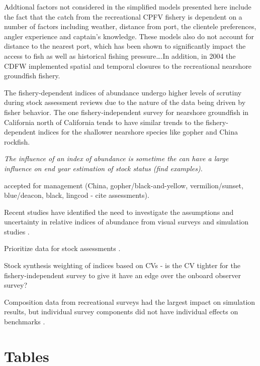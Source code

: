 \documentclass[
  12pt,
  authoryear,
  preprint,
  3p]{elsarticle}
\begin{document}
Addtional factors not considered in the simplified models presented here
include the fact that the catch from the recreational CPFV fishery is
dependent on a number of factors including weather, distance from port,
the clientele preferences, angler experience and captain's knowledge.
These models also do not account for distance to the nearest port, which
has been shown to significantly impact the access to fish as well as
historical fishing pressure\ldots.In addition, in 2004 the CDFW
implemented spatial and temporal closures to the recreational nearshore
groundfish fishery.

The fishery-dependent indices of abundance undergo higher levels of
scrutiny during stock assessment reviews due to the nature of the data
being driven by fisher behavior. The one fishery-independent survey for
nearshore groundfish in California north of California tends to have
similar trends to the fishery-dependent indices for the shallower
nearshore species like gopher and China rockfish.

\emph{The influence of an index of abundance is sometime the can have a
large influence on end year estimation of stock status (find examples).}

accepted for management (China, gopher/black-and-yellow,
vermilion/sunset, blue/deacon, black, lingcod - cite assessments).

Recent studies have identified the need to investigate the assumptions
and uncertainty in relative indices of abundance from visual surveys
\citep{Bacheler:2015:ERA, Campbell:2015:CRA} and simulation studies
\citep{Siegfried:2016:ISA}.

Prioritize data for stock assessments \citep{Magnusson:2007:WMF}.

Stock synthesis weighting of indices based on CVs - is the CV tighter
for the fishery-independent survey to give it have an edge over the
onboard observer survey?

Composition data from recreational surveys had the largest impact on
simulation results, but individual survey components did not have
individual effects on benchmarks \citep{Siegfried:2016:ISA}.

\FloatBarrier

\hypertarget{tables}{%
\section{Tables}\label{tables}}
\end{document}
